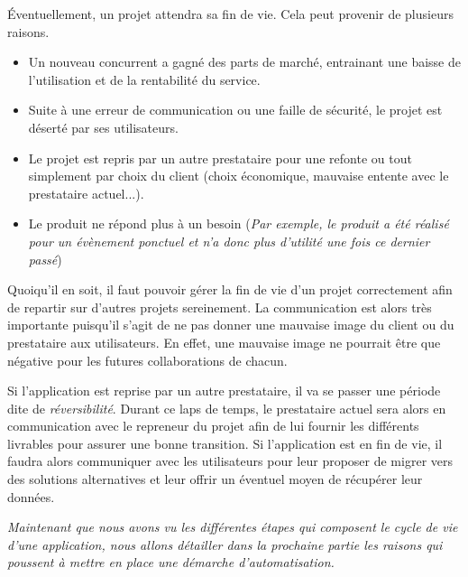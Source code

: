 Éventuellement, un projet attendra sa fin de vie. Cela peut provenir de plusieurs raisons.

\begin{itemize}
	\setlength\itemsep{0em}
	\item Un nouveau concurrent a gagné des parts de marché, entrainant une baisse de l'utilisation et de la rentabilité du service.
	\item Suite à une erreur de communication ou une faille de sécurité, le projet est déserté par ses utilisateurs.
	\item Le projet est repris par un autre prestataire pour une refonte ou tout simplement par choix du client (choix économique, mauvaise entente avec le prestataire actuel...).
	\item Le produit ne répond plus à un besoin (\emph{Par exemple, le produit a été réalisé pour un évènement ponctuel et n'a donc plus d'utilité une fois ce dernier passé})
\end{itemize}

Quoiqu'il en soit, il faut pouvoir gérer la fin de vie d'un projet correctement afin de repartir sur d'autres projets sereinement. La communication est alors très importante puisqu'il s'agit de ne pas donner une mauvaise image du client ou du prestataire aux utilisateurs. En effet, une mauvaise image ne pourrait être que négative pour les futures collaborations de chacun.

Si l'application est reprise par un autre prestataire, il va se passer une période dite de \emph{réversibilité}. Durant ce laps de temps, le prestataire actuel sera alors en communication avec le repreneur du projet afin de lui fournir les différents livrables pour assurer une bonne transition. Si l'application est en fin de vie, il faudra alors communiquer avec les utilisateurs pour leur proposer de migrer vers des solutions alternatives et leur offrir un éventuel moyen de récupérer leur données.

\hrulefill

\emph{Maintenant que nous avons vu les différentes étapes qui composent le cycle de vie d'une application, nous allons détailler dans la prochaine partie les raisons qui poussent à mettre en place une démarche d'automatisation.}